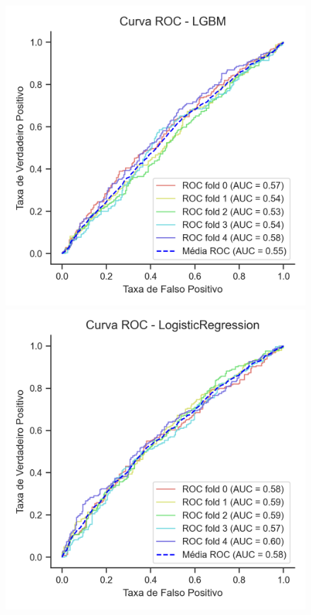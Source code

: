 \begin{figure}
\begin{minipage}[t]{0.28\textwidth}
	\end{minipage}
	\hfill
	\begin{minipage}[t]{0.28\textwidth}
		\centering
		\includegraphics[width=\textwidth]{USPSC-img/Curva ROC - LGBM.png}
	\end{minipage}
	\hfill
	\begin{minipage}[t]{0.28\textwidth}
		\centering
		\includegraphics[width=\textwidth]{USPSC-img/Curva ROC - LogisticRegression.png}
	\end{minipage}
	

\end{figure}
